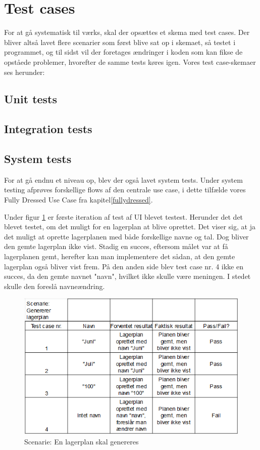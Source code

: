 \section{Test cases}
For at gå systematisk til værks, skal der opsættes et skema med test cases\cite{Heumann}. Der bliver altså lavet flere scenarier som først blive sat op i skemaet, så testet i programmet, og til sidst vil der foretages ændringer i koden som kan fikse de opståede problemer, hvorefter de samme tests køres igen. Vores test case-skemaer ses herunder:

\subsection{Unit tests}


\subsection{Integration tests}


\subsection{System tests}
For at gå endnu et niveau op, blev der også lavet system tests\cite{TestLevels}. Under system testing afprøves forskellige flows af den centrale use case, i dette tilfælde vores Fully Dressed Use Case fra kapitel\ref{fullydressed}.



Under figur \ref{fig:testgenerate} er første iteration af test af UI blevet testest. Herunder det det blevet testet, om det muligt for en lagerplan at blive oprettet. Det viser sig, at ja det muligt at oprette lagerplanen med både forskellige navne og tal. Dog bliver den gemte lagerplan ikke vist. Stadig en succes, eftersom målet var at få lagerplanen gemt, herefter kan man implementere det sådan, at den gemte lagerplan også bliver vist frem. På den anden side blev test case nr. 4 ikke en succes, da den gemte navnet "navn", hvilket ikke skulle være meningen. I stedet skulle den foreslå navneændring.

\begin{figure}[p]
    \centering
    \includegraphics[width=0.8\hsize]{figures/tests/test_generer_plan.png}
    \caption{Scenarie: En lagerplan skal genereres}
    \label{fig:testgenerate}
\end{figure}

